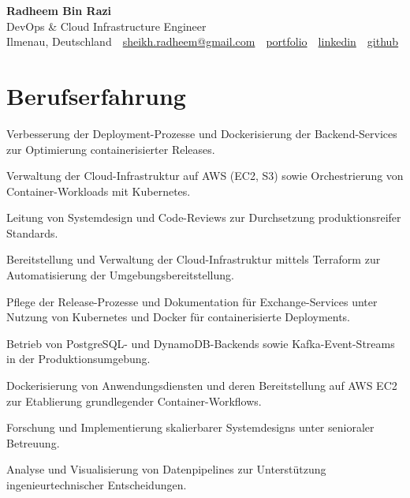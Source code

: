 \documentclass[11pt,a4paper]{resume}
\makeatletter
\newcommand{\Portfolio}{https://radheem.github.io/my-cv}
\newcommand{\PortfolioText}{portfolio}
\newcommand{\GitHub}{https://github.com/radheem}
\newcommand{\LinkedIn}{https://www.linkedin.com/in/radheem-razi}
\newcommand{\Email}{sheikh.radheem@gmail.com}
\makeatother
\begin{document}
\clearpage
{}

\begin{center}
  {\huge\bfseries Radheem Bin Razi}\\[3pt]
  {\large DevOps \& Cloud Infrastructure Engineer}\\[6pt]
  \small
  Ilmenau, Deutschland \,\textbar\,
  \href{mailto:\Email}{\Email} \,\textbar\,
  \href{\Portfolio}{\PortfolioText} \,\textbar\,
  \href{\LinkedIn}{linkedin} \,\textbar\,
  \href{\GitHub}{github}
\end{center}
\vspace{2pt}

\section{Berufserfahrung}

\bullets
  \item Verbesserung der Deployment-Prozesse und Dockerisierung der Backend-Services zur Optimierung containerisierter Releases.
  \item Verwaltung der Cloud-Infrastruktur auf AWS (EC2, S3) sowie Orchestrierung von Container-Workloads mit Kubernetes.
  \item Leitung von Systemdesign und Code-Reviews zur Durchsetzung produktionsreifer Standards.
\bulletsend
\vspace{3pt}
\bullets
  \item Bereitstellung und Verwaltung der Cloud-Infrastruktur mittels Terraform zur Automatisierung der Umgebungsbereitstellung.
  \item Pflege der Release-Prozesse und Dokumentation für Exchange-Services unter Nutzung von Kubernetes und Docker für containerisierte Deployments.
  \item Betrieb von PostgreSQL- und DynamoDB-Backends sowie Kafka-Event-Streams in der Produktionsumgebung.
\bulletsend
\vspace{3pt}
\bullets
  \item Dockerisierung von Anwendungsdiensten und deren Bereitstellung auf AWS EC2 zur Etablierung grundlegender Container-Workflows.
  \item Forschung und Implementierung skalierbarer Systemdesigns unter senioraler Betreuung.
  \item Analyse und Visualisierung von Datenpipelines zur Unterstützung ingenieurtechnischer Entscheidungen.
\bulletsend
\vspace{3pt}
\end{document}
